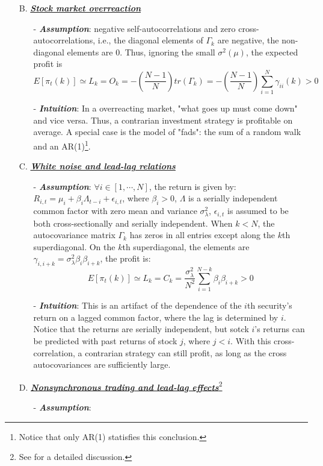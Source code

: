 \begin{enumerate}
    \item[B.] \underline{\textbf{\textit{Stock market overreaction}}}
    \begin{enumerate}
        \item[-] \textbf{\textit{Assumption}}: negative self-autocorrelations and zero cross-autocorrelations, i.e., 
        the diagonal elements of $\Gamma_k$ are negative, the non-diagonal elements are 0. Thus, ignoring the small $\sigma^2(\mu)$, 
        the expected profit is $$E[\pi_t(k)]\simeq L_k = O_k = -\left(\frac{N-1}{N}\right)tr(\Gamma_k) = -\left(\frac{N-1}{N}\right)\sum^N_{i=1}\gamma_{ii}(k)>0$$ 
        \item[-] \textit{\textbf{Intuition}}: In a overreacting market, "what goes up must come down" and vice versa. Thus, a contrarian investment strategy is profitable on average.
        A special case is the model of "fads": the sum of a random walk and an AR(1)\footnote{Notice that only AR(1) statisfies this conclusion.}.
    \end{enumerate}
    \item[C.] \underline{\textbf{\textit{White noise and lead-lag relations}}}
    \begin{enumerate}
        \item[-] \textbf{\textit{Assumption}}: $\forall i \in [1,\cdots,N]$, the return is given by: $R_{i,t}=\mu_i+\beta_i\Lambda_{t-i}+\epsilon_{i,t}$, where $\beta_i>0$,
        $\Lambda$ is a serially independent common factor with zero mean and variance $\sigma_{\lambda}^2$, $\epsilon_{i,t}$ is assumed to be both cross-sectionally and serially independent.
        When $k<N$, the autocovariance matrix $\Gamma_k$ has zeros in all entries except along the $k$th superdiagonal. On the $k$th superdiagonal, 
        the elements are $\gamma_{i,i+k}=\sigma^2_{\lambda}\beta_i\beta_{i+k}$, the profit is: $$E[\pi_t(k)]\simeq L_k = C_k = \frac{\sigma^2_{\lambda}}{N^2}\sum^{N-k}_{i=1}\beta_i\beta_{i+k}>0$$
        \item[-] \textbf{\textit{Intuition}}: This is an artifact of the dependence of the $i$th security's return on a lagged common factor, where the lag is determined by $i$. Notice that the returns
        are serially independent, but sotck $i$'s returns can be predicted with past returns of stock $j$, where $j<i$. With this cross-correlation, a contrarian strategy can still profit, as long
        as the cross autocovariances are sufficiently large.
    \end{enumerate} 
    \item[D.] \underline{\textbf{\textit{Nonsynchronous trading and lead-lag effects}}}\footnote{See \citet{lo1990econometric} for a detailed discussion.}
    \begin{enumerate}
        \item[-] \textbf{\textit{Assumption}}:
        

\end{enumerate}
\end{enumerate}
